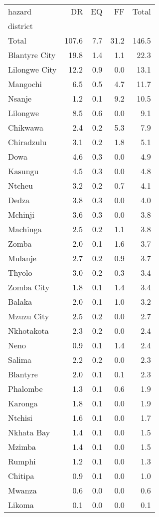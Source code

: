 \begin{tabular}{lrrrr}
\toprule
hazard &     DR &   EQ &    FF &  Total \\
district      &        &      &       &        \\
\midrule
Total         &  107.6 &  7.7 &  31.2 &  146.5 \\
Blantyre City &   19.8 &  1.4 &   1.1 &   22.3 \\
Lilongwe City &   12.2 &  0.9 &   0.0 &   13.1 \\
Mangochi      &    6.5 &  0.5 &   4.7 &   11.7 \\
Nsanje        &    1.2 &  0.1 &   9.2 &   10.5 \\
Lilongwe      &    8.5 &  0.6 &   0.0 &    9.1 \\
Chikwawa      &    2.4 &  0.2 &   5.3 &    7.9 \\
Chiradzulu    &    3.1 &  0.2 &   1.8 &    5.1 \\
Dowa          &    4.6 &  0.3 &   0.0 &    4.9 \\
Kasungu       &    4.5 &  0.3 &   0.0 &    4.8 \\
Ntcheu        &    3.2 &  0.2 &   0.7 &    4.1 \\
Dedza         &    3.8 &  0.3 &   0.0 &    4.0 \\
Mchinji       &    3.6 &  0.3 &   0.0 &    3.8 \\
Machinga      &    2.5 &  0.2 &   1.1 &    3.8 \\
Zomba         &    2.0 &  0.1 &   1.6 &    3.7 \\
Mulanje       &    2.7 &  0.2 &   0.9 &    3.7 \\
Thyolo        &    3.0 &  0.2 &   0.3 &    3.4 \\
Zomba City    &    1.8 &  0.1 &   1.4 &    3.4 \\
Balaka        &    2.0 &  0.1 &   1.0 &    3.2 \\
Mzuzu City    &    2.5 &  0.2 &   0.0 &    2.7 \\
Nkhotakota    &    2.3 &  0.2 &   0.0 &    2.4 \\
Neno          &    0.9 &  0.1 &   1.4 &    2.4 \\
Salima        &    2.2 &  0.2 &   0.0 &    2.3 \\
Blantyre      &    2.0 &  0.1 &   0.1 &    2.3 \\
Phalombe      &    1.3 &  0.1 &   0.6 &    1.9 \\
Karonga       &    1.8 &  0.1 &   0.0 &    1.9 \\
Ntchisi       &    1.6 &  0.1 &   0.0 &    1.7 \\
Nkhata Bay    &    1.4 &  0.1 &   0.0 &    1.5 \\
Mzimba        &    1.4 &  0.1 &   0.0 &    1.5 \\
Rumphi        &    1.2 &  0.1 &   0.0 &    1.3 \\
Chitipa       &    0.9 &  0.1 &   0.0 &    1.0 \\
Mwanza        &    0.6 &  0.0 &   0.0 &    0.6 \\
Likoma        &    0.1 &  0.0 &   0.0 &    0.1 \\
\bottomrule
\end{tabular}
